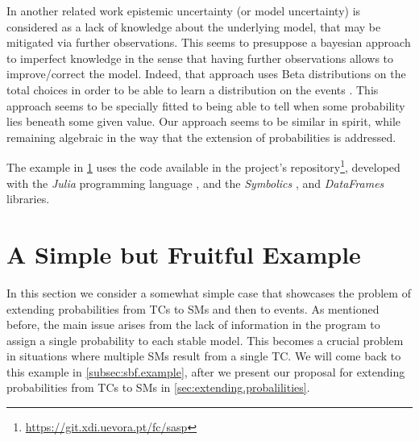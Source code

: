 \documentclass[adraft,copyright,creativecommons]{eptcs}
\newcounter{remark}
\newcommand{\remark}[2]{%
    \stepcounter{remark}%
    \!{\color{red}/\!}%
    #1%
    {\!\color{red}/}\footnotemark[\arabic{remark}]%
    \footnotetext[\arabic{remark}]{{\color{red}/}#2}%
    }
\begin{document}
In another related work \cite{verreet2022inference} epistemic uncertainty (or model uncertainty) is considered as a lack of knowledge about the underlying model, that may be mi\-ti\-ga\-ted via further observations. This seems to presuppose a bayesian approach to imperfect knowledge in the sense that having further observations allows to improve/correct the model. Indeed, that approach uses Beta distributions on the total choices in order to be able to learn a distribution on the events
. This approach seems to be specially fitted to being able to tell when some probability lies beneath some given value. Our approach seems to be similar in spirit, while remaining algebraic in the way that the extension of probabilities is addressed.

The example in \cref{sec:example.1} uses the code available in the project's repository\footnote{\url{https://git.xdi.uevora.pt/fc/sasp}}, developed with the \textit{Julia} programming language \cite{bezanson2017julia}, and the \textit{Symbolics} \cite{gowda2021high}, and \textit{DataFrames} \cite{bouchetvalat2023dataframes} libraries.
%
%
%
\section{A Simple but Fruitful Example}\label{sec:example.1}
%
%
%
In this section we consider a somewhat simple case that showcases the problem of extending probabilities from \aclp{TC} to \aclp{SM} and then to events. As mentioned before, the main issue arises from the lack of information in the program to assign a single probability to each stable model. This becomes a crucial problem in situations where multiple \aclp{SM} result from a single \acl{TC}. We will come back to this example in \cref{subsec:sbf.example}, after we present our proposal for extending probabilities from \aclp{TC} to \aclp{SM} in \cref{sec:extending.probalilities}.
\end{document}
